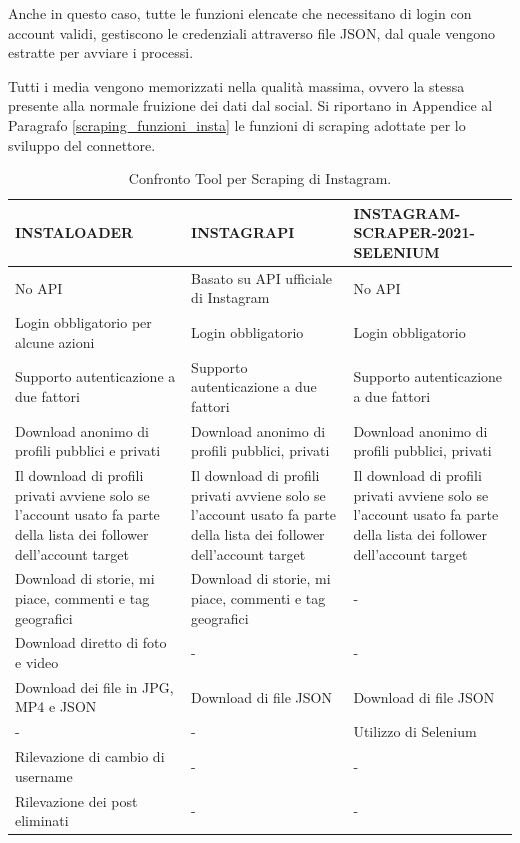 Anche in questo caso, tutte le funzioni elencate che necessitano di login con account validi, gestiscono le credenziali attraverso file JSON, dal quale vengono estratte per avviare i processi.

Tutti i media vengono memorizzati nella qualit\`a massima, ovvero la stessa presente alla normale fruizione dei dati dal social. 
Si riportano in Appendice al Paragrafo \ref{scraping_funzioni_insta} le funzioni di scraping adottate per lo sviluppo del connettore.
\clearpage
\begin{table}[!htb]
\centering
\caption{Confronto Tool per Scraping di Instagram.}
\label{tabella_insta}
\begin{tabular}{|p{}|p{}|p{}|}
\hline
\textbf{INSTALOADER} & \textbf{INSTAGRAPI} & \textbf{INSTAGRAM-SCRAPER-2021-SELENIUM} \\\hline
No API & Basato su API ufficiale di Instagram & No API \\\hline
Login obbligatorio per alcune azioni & Login obbligatorio & Login obbligatorio\\\hline
Supporto autenticazione a due fattori & Supporto autenticazione a due fattori & Supporto autenticazione a due fattori \\\hline
Download anonimo di profili pubblici e privati & Download anonimo di profili pubblici, privati & Download anonimo di profili pubblici, privati \\\hline
Il download di profili privati avviene solo se l’account usato fa parte della lista dei follower dell’account target & Il download di profili privati avviene solo se l’account usato fa parte della lista dei follower dell’account target & Il download di profili privati avviene solo se l’account usato fa parte della lista dei follower dell’account target \\\hline
Download di storie, mi piace, commenti e tag geografici & Download di storie, mi piace, commenti e tag geografici & -\\\hline
Download diretto di foto e video & - & - \\\hline
Download dei file in JPG, MP4 e JSON & Download di file JSON & Download di file JSON \\\hline
- & - & Utilizzo di Selenium \\\hline
Rilevazione di cambio di username & - & -\\\hline
Rilevazione dei post eliminati & - & - \\\hline
\end{tabular}
\end{table}
